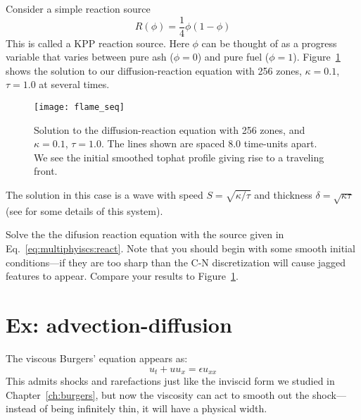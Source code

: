Consider a simple reaction source
\begin{equation}
  \label{eq:multiphysics:react}
  R(\phi) = \frac{1}{4} \phi (1 - \phi)
\end{equation}
This is called a KPP reaction source.  Here $\phi$ can be thought of
as a progress variable that varies between pure ash ($\phi = 0$) and
pure fuel ($\phi = 1$).  Figure~\ref{fig:diffreact} shows the solution
to our diffusion-reaction equation with 256 zones, $\kappa = 0.1$,
$\tau = 1.0$ at several times.

\begin{figure}[t]
\centering
\texttt{[image: flame\_seq]}
\caption[Solution to the diffusion-reaction equation]
  {\label{fig:diffreact} Solution to the diffusion-reaction equation
   with 256 zones, and $\kappa = 0.1$, $\tau = 1.0$.  The lines shown
   are spaced 8.0 time-units apart.  We see the initial smoothed tophat
   profile giving rise to a traveling front. \\
   }
\end{figure}

 The solution in this case is a wave with speed $S = \sqrt{\kappa/\tau}$
 and thickness $\delta = \sqrt{\kappa \tau}$ (see \cite{vladimirova2006} for
 some details of this system).

\begin{exercise}
 Solve the the difusion reaction equation with the source given in
 Eq.~\ref{eq:multiphyiscs:react}.  Note that you should begin with
 some smooth initial conditions---if they are too sharp than the
 C-N discretization will cause jagged features to appear.
 Compare your results to Figure~\ref{fig:diffreact}.
\end{exercise}


\section{Ex: advection-diffusion}

\label{ch:multiphysics:sec:adburgers}

The viscous Burgers' equation appears as:
\begin{equation}
u_t + u u_x = \epsilon u_{xx}
\end{equation}
This admits shocks and rarefactions just like the inviscid form we
studied in Chapter~\ref{ch:burgers}, but now the viscosity can act to
smooth out the shock---instead of being infinitely thin, it will have
a physical width.

